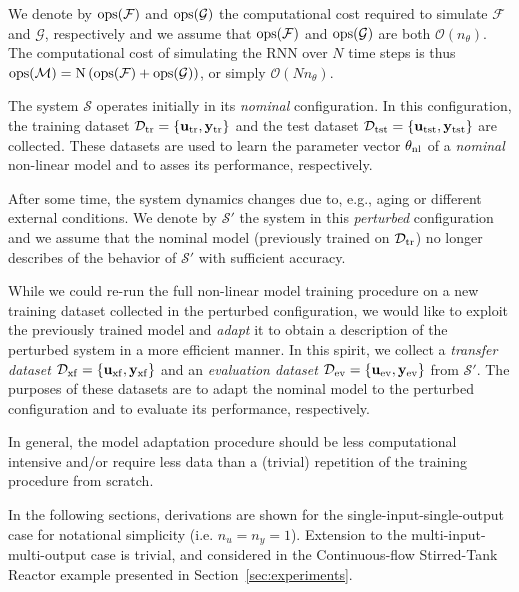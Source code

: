 \documentclass{article}
\newcommand{\nsamp}{{N}}
\newcommand{\npar}{{n_\theta}}
\newcommand{\M}{\mathcal{M}}
\newcommand{\F}{\mathcal{F}}
\newcommand{\G}{\mathcal{G}}
\newcommand{\D}{\mathcal{D}}
\newcommand{\sys}{{\mathcal{S}}}
\newcommand{\tr}{{\rm{tr}}}
\newcommand{\tst}{{\rm{tst}}}
\newcommand{\transf}{{\rm{xf}}}
\newcommand{\eval}{{\rm{ev}}}
\newcommand{\ops}{\rm{ops}}
\newcommand{\nominal}{{\rm{nl}}}
\newcommand{\tvec}[1]{{\mathbf{#1}}}
\begin{document}
We denote by $\ops(\F)$ and $\ops(\G)$ the computational cost required to simulate $\F$ and $\G$, respectively and we assume that $\ops(\F)$ and $\ops(\G)$ are both $\mathcal{O}(\npar)$.
The computational cost of simulating the RNN over $\nsamp$ time
steps is thus $\ops(\M) = \nsamp \left(\ops(\F) + \ops(\G)\right)$, 
or simply $\mathcal{O}(\nsamp \npar)$.



The system  $\sys$ operates initially in its \emph{nominal} configuration. In this configuration, the training dataset $\D_\tr = \{\tvec{u}_\tr, \tvec{y}_\tr\}$ and the test dataset 
$\D_\tst = \{\tvec{u}_\tst, \tvec{y}_\tst\}$ are collected. These datasets are used to 
learn the parameter vector $\theta_\nominal$ of a \emph{nominal} non-linear model 
and to asses its performance, respectively.

After some time, the system dynamics changes due to, e.g., aging or different external conditions.
We denote by $\sys'$ the system in this \emph{perturbed} configuration and we assume that the nominal model
(previously trained on $\D_\tr$) no longer describes of the behavior of $\sys'$ with sufficient accuracy.

While we could re-run the full non-linear model training procedure on a new training dataset collected in the perturbed configuration, we would like to exploit the previously trained model and \emph{adapt} it to obtain a description of the perturbed system in a more efficient manner.  In this spirit, we collect a \emph{transfer dataset} $\D_\transf = \{\tvec{u}_\transf, \tvec{y}_\transf\}$ and an \emph{evaluation dataset} $\D_\eval = \{\tvec{u}_\eval, \tvec{y}_\eval\}$ from $\sys'$. The purposes of these datasets are to adapt the nominal model to the perturbed configuration and to evaluate its performance, respectively.

In general, the model adaptation procedure should be less computational intensive and/or require less data than a (trivial) repetition of the training procedure from scratch.

In the following sections, derivations are shown for the single-input-single-output case for notational simplicity (i.e. $n_u = n_{y} = 1$). Extension to the multi-input-multi-output case is trivial, and considered in the Continuous-flow Stirred-Tank Reactor example presented in Section~\ref{sec:experiments}.
\end{document}
